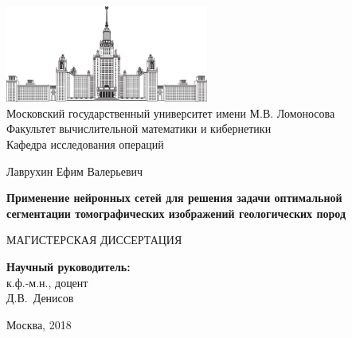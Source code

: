 \documentclass[12pt, a4paper]{extarticle}
\begin{document}
\allowdisplaybreaks[1]

\begin{titlepage}
\begin{center}
\ \vspace{-1.5cm}

\includegraphics[width=0.5\textwidth]{data/images/msu_logo.eps}\\
{ Московский государственный университет имени М.В. Ломоносова \\
Факультет вычислительной математики и кибернетики\\
Кафедра исследования операций}

\vspace{3cm}

{\Large Лаврухин Ефим Валерьевич}

\vspace{1cm}

{\Large\bfseries
Применение нейронных сетей для решения задачи оптимальной сегментации томографических
изображений геологических пород\\}

\vspace{1cm}

{\textbf \large МАГИСТЕРСКАЯ ДИССЕРТАЦИЯ}
\end{center}

\vfill

\begin{flushright}
  \textbf{Научный руководитель:}\\
  к.ф.-м.н., доцент\\
  Д.В.~Денисов
\end{flushright}

\vfill

\begin{center}
Москва, 2018
\end{center}

\vspace{1cm}

\enlargethispage{2\baselineskip}

\end{titlepage}

\end{document}
